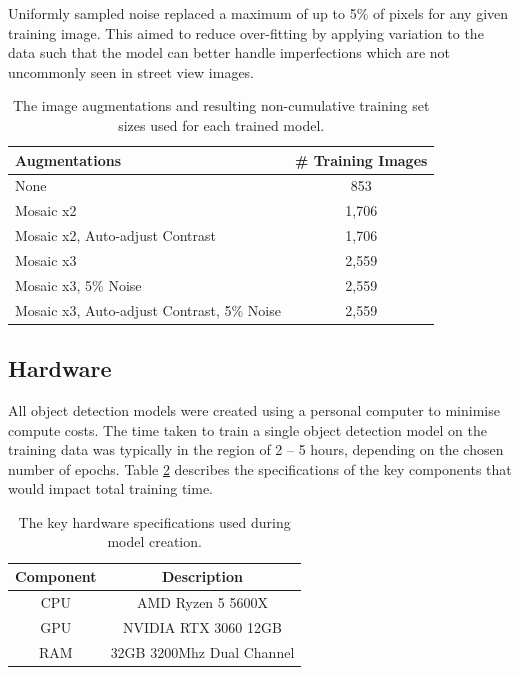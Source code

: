 \documentclass{thesis}
\begin{document}
Uniformly sampled noise replaced a maximum of up to 5\% of pixels for any given training image. This aimed to reduce over-fitting by applying variation to the data such that the model can better handle imperfections which are not uncommonly seen in street view images.

\begin{table}[ht!]
    \centering
    \begin{tabular}{|l| |c|} 
     \hline
      \textbf{Augmentations} & \textbf{\# Training Images} \\
     \hline\hline
     None & 853 \\
     Mosaic x2 & 1,706  \\
     Mosaic x2, Auto-adjust Contrast & 1,706  \\
     Mosaic x3 & 2,559\\
     Mosaic x3, 5\% Noise & 2,559 \\
     Mosaic x3, Auto-adjust Contrast, 5\% Noise & 2,559 \\
     \hline
    \end{tabular}
    \hspace{100mm}
    \caption{The image augmentations and resulting non-cumulative training set sizes used for each trained model.}
    \label{table:model-augmentations}
\end{table}

\subsection{Hardware}

All object detection models were created using a personal computer to minimise compute costs. The time taken to train a single object detection model on the training data was typically in the region of 2 -- 5 hours, depending on the chosen number of epochs. Table \ref{table:hardware} describes the specifications of the key components that would impact total training time.

\begin{table}[ht!]
    \centering
    \begin{tabular}{|c| |c|} 
     \hline
     \textbf{Component} & \textbf{Description} \\ [0.5ex] 
     \hline\hline
     CPU & AMD Ryzen 5 5600X \\
     GPU & NVIDIA RTX 3060 12GB \\
     RAM & 32GB 3200Mhz Dual Channel  \\
     \hline
    \end{tabular}
    \hspace{100mm}
    \caption{The key hardware specifications used during model creation.}
    \label{table:hardware}
\end{table}
\end{document}
